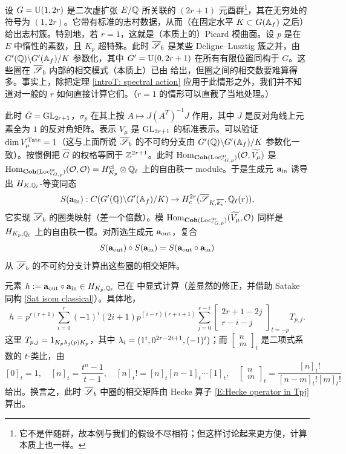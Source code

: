 \begin{ex}\label{Tate cycle on U(1,2n)}
设 $G=\operatorname{U}(1,2r)$ 是二次虚扩张 $E/{\mathbb Q}$ 所关联的 $(2r+1)$ 元酉群\footnote{它不是伴随群，故本例与我们的假设不尽相符；但这样讨论起来更方便，计算本质上也一样。}，其在无穷处的符号为 $(1,2r)$。它带有标准的志村数据，从而（在固定水平 $K\subset G({\mathbb A}_f)$ 之后）给出志村簇。特别地，若 $r=1$，这就是（本质上的）Picard 模曲面。设 $p$ 是在 $E$ 中惰性的素数，且 $K_p$ 超特殊。此时 $\overline{{\mathscr S}}_b$ 是某些 Deligne--Lusztig 簇之并，由 $G'({\mathbb Q})\backslash G'({\mathbb A}_f)/K$ 参数化，其中 $G'=\operatorname{U}(0,2r+1)$ 在所有有限位置同构于 $G$。这些圈在 $\overline{{\mathscr S}}_b$ 内部的相交模式（本质上）已由 \cite{Vollaard-Wedhorn-GU(n1)} 给出，但圈之间的相交数要难算得多。事实上，除把定理 \ref{introT: spectral action} 应用于此情形之外，我们并不知道对一般的 $r$ 如何直接计算它们。（$r=1$ 的情形可以直截了当地处理。）

此时 $\hat G={\operatorname{GL}}_{2r+1}$，$\sigma_p$ 在其上按 $A\mapsto J(A^T)^{-1}J$ 作用，其中 $J$ 是反对角线上元素全为 $1$ 的反对角矩阵。表示 $V_\mu$ 是 ${\operatorname{GL}}_{2r+1}$ 的标准表示。可以验证 $\dim V_\mu^{{\operatorname{Tate}}}=1$（这与上面所说 $\overline{{\mathscr S}}_b$ 的不可约分支由 $G'({\mathbb Q})\backslash G'({\mathbb A}_f)/K$ 参数化一致）。按惯例把 $\hat G$ 的权格等同于 ${\mathbb Z}^{2r+1}$。此时 ${\operatorname{Hom}}_{{\mathbf{Coh}}({\operatorname{Loc}}_{{}^cG,p}^{{\operatorname{ur}}})}({\mathcal O},\widetilde{V_{\mu}})$ 是 ${\operatorname{Hom}}_{{\mathbf{Coh}}({\operatorname{Loc}}_{{}^cG,p}^{{\operatorname{ur}}})}({\mathcal O},{\mathcal O})=H_{K_p}^{{\operatorname{cl}}}\otimes{\mathbb Q}_\ell$ 上的自由秩一 module。于是生成元 $\mathbf a_{\operatorname{in}}$ 诱导出 $H_{K,{\mathbb Q}_\ell}$-等变同态
\[S(\mathbf a_{\operatorname{in}}): C(G'({\mathbb Q})\backslash G'({\mathbb A}_f)/K)\to H_c^{2r}(\overline{{\mathscr S}}_{K,\overline{k_v}},{\mathbb Q}_\ell(r)),\]
它实现 $\overline{{\mathscr S}}_b$ 的圈类映射（差一个倍数）。模 ${\operatorname{Hom}}_{{\mathbf{Coh}}({\operatorname{Loc}}_{{}^cG,p}^{{\operatorname{ur}}})}(\widetilde{V_{\mu}},{\mathcal O})$ 同样是 $H_{K_p,{\mathbb Q}_\ell}$ 上的自由秩一模。对所选生成元 $\mathbf a_{\operatorname{out}}$，复合
\[S(\mathbf a_{\operatorname{out}})\circ S(\mathbf a_{\operatorname{in}})=S(\mathbf a_{\operatorname{out}}\circ\mathbf a_{\operatorname{in}})\]
从 $\overline{{\mathscr S}}_b$ 的不可约分支计算出这些圈的相交矩阵。

元素 $h:=\mathbf a_{\operatorname{out}}\circ\mathbf a_{\operatorname{in}} \in H_{K_p,{\mathbb Q}_\ell}$ 已在 \cite[Example 6.4.2]{Xiao-Zhu-Invariants} 中显式计算（差显然的修正，并借助 Satake 同构 \eqref{Sat isom classical}）。具体地，
\begin{equation}
\label{E:Hecke operator in Tpj}
h=p^{r(r+1)}\sum_{i=0}^{r} (-1)^i(2i+1)p^{(i-r)(r+i+1)}\sum_{j=0}^{r-i} \begin{bmatrix} 2r+1-2j \\ r-i- j\end{bmatrix}_{t=-p}T_{p,j}.
\end{equation}
这里 $T_{p,j}=1_{K_p{\lambda}_j(p)K_p}$，其中 ${\lambda}_i=(1^i,0^{2r-2i+1},(-1)^i)$；而 $\begin{bmatrix} n \\ m\end{bmatrix}_t$ 是二项式系数的 $t$-类比，由
\[
[0]_t=1,\quad [n]_t=\frac{t^n-1}{t-1},\quad [n]_t!=[n]_t[n-1]_t\cdots[1]_t,\quad \begin{bmatrix} n \\ m\end{bmatrix}_t=\frac{[n]_t!}{[n-m]_t![m]_t!}
\]
给出。换言之，此时 $\overline{{\mathscr S}}_b$ 中圈的相交矩阵由 Hecke 算子 \eqref{E:Hecke operator in Tpj} 算出。


\end{ex}
